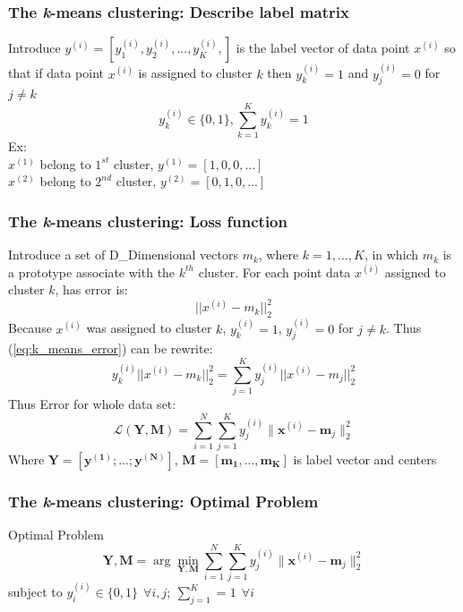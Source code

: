 \documentclass{beamer}
\begin{document}
\begin{frame}
\frametitle{The {\it k}-means clustering: Describe label matrix}
Introduce $y^{(i)} =[y_{1}^{(i)},y_{2}^{(i)},...,y_{K}^{(i)},]$ is the label vector of data point $x^{(i)}$ so that if data point $x^{(i)}$ is assigned to cluster $k$ then $y^{(i)}_k = 1$ and $y^{(i)}_j = 0$ for $j \neq k$
\begin{equation}
y^{(i)}_k \in \{0,1\}, \sum^K_{k=1}y^{(i)}_k = 1
\end{equation}
\quad Ex:\\
\qquad $x^{(1)}$ belong to $1^{st}$ cluster, $y^{(1)}=[1,0,0,...]$\\
\qquad $x^{(2)}$ belong to $2^{nd}$ cluster, $y^{(2)}=[0,1,0,...]$

\end{frame}
\begin{frame}
\frametitle{The {\it k}-means clustering: Loss function}
Introduce a set of D\_Dimensional vectors $m_k$, where $k = 1,...,K$, in which $m_k$ is a prototype associate with the $k^{th}$ cluster. For each point data $x^{(i)}$  assigned to cluster $k$, has error is:
\begin{equation}
||x^{(i)} - m_k||^2_2
\label{eq:k_means_error}
\end{equation}
Because $x^{(i)}$ was assigned to cluster $k$, $y^{(i)}_k = 1$, $y^{(i)}_j = 0$ for $j \neq k$. Thus (\ref{eq:k_means_error}) can be rewrite:
\begin{equation}
	y^{(i)}_k||x^{(i)} - m_k||^2_2 = \sum^K_{j=1}y^{(i)}_j||x^{(i)} - m_j||^2_2
\end{equation}
Thus Error for whole data set:
\begin{equation}
\mathcal{L}(\mathbf{Y}, \mathbf{M}) = \sum_{i=1}^N\sum_{j=1}^K y^{(i)}_{j} \|\mathbf{x}^{(i)} - \mathbf{m}_j\|_2^2
\label{eq:kmeans_flost}
\end{equation}
Where $\mathbf{Y = [y^{(1)};...;y^{(N)}]}$, $\mathbf{M = [m_1,...,m_K]}$ is label vector and centers 
\end{frame}

\begin{frame}
\frametitle{The {\it k}-means clustering: Optimal Problem}
Optimal Problem
\begin{equation}
\mathbf{Y,M} =\arg\min_{\mathbf{Y,M}}\sum^N_{i=1}\sum^K_{j=1}y^{(i)}_j\|\mathbf{x}^{(i)}-\mathbf{m}_j\|^2_2
\end{equation}
\qquad subject to $ y^{(i)}_i \in \{0,1\} ~~\forall i,j;~ \sum^K_{j=1}=1 ~~\forall i$
\end{frame}
\end{document}
